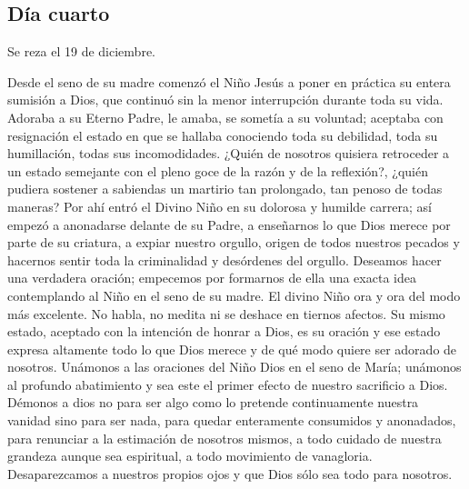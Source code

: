 \documentclass[spanish,utf8,twocolumn]{chlart}
\newenvironment{summary}{\begingroup
	\small\sffamily\itshape%
	\setlength{\leftskip}{3em}\setlength{\rightskip}{3em}\noindent
	}{\par\endgroup}
\newenvironment{lectura}{\begingroup\color{lector}}{\endgroup\par}
\begin{document}
\subsection*{Día cuarto}
\begin{summary}
Se reza el 19 de diciembre.
\end{summary}
\begin{lectura}
Desde el seno de su madre comenzó el Niño Jesús a poner en práctica su
entera sumisión a Dios, que continuó sin la menor interrupción durante
toda su vida.
Adoraba a su Eterno Padre, le amaba, se sometía a su voluntad; aceptaba
con resignación el estado en que se hallaba conociendo toda su
debilidad, toda su humillación, todas sus incomodidades.
¿Quién de nosotros quisiera retroceder a un estado semejante con el
pleno goce de la razón y de la reflexión?, ¿quién pudiera sostener a
sabiendas un martirio tan prolongado, tan penoso de todas maneras?
Por ahí entró el Divino Niño en su dolorosa y humilde carrera; así
empezó a anonadarse delante de su Padre, a enseñarnos lo que Dios merece
por parte de su criatura, a expiar nuestro orgullo, origen de todos
nuestros pecados y hacernos sentir toda la criminalidad y desórdenes del
orgullo.
Deseamos hacer una verdadera oración; empecemos por formarnos de ella
una exacta idea contemplando al Niño en el seno de su madre.
El divino Niño ora y ora del modo más excelente.
No habla, no medita ni se deshace en tiernos afectos.
Su mismo estado, aceptado con la intención de honrar a Dios, es su
oración y ese estado expresa altamente todo lo que Dios merece y de qué
modo quiere ser adorado de nosotros.
Unámonos a las oraciones del Niño Dios en el seno de María; unámonos al
profundo abatimiento y sea este el primer efecto de nuestro sacrificio a
Dios.
Démonos a dios no para ser algo como lo pretende continuamente nuestra
vanidad sino para ser nada, para quedar enteramente consumidos y
anonadados, para renunciar a la estimación de nosotros mismos, a todo
cuidado de nuestra grandeza aunque sea espiritual, a todo movimiento de
vanagloria.
Desaparezcamos a nuestros propios ojos y que Dios sólo sea todo para
nosotros.
\end{lectura}
\end{document}
